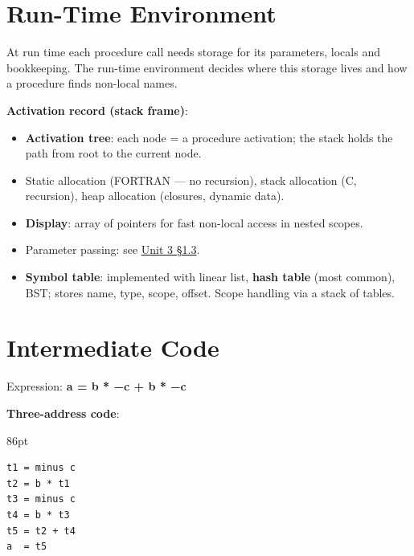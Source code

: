 

\needspace{125pt}

\hypertarget{p2-08--12-run-time-environment}{%
\section{Run-Time Environment}\label{p2-08--12-run-time-environment}}

At run time each procedure call needs storage for its parameters, locals and bookkeeping. The run-time
environment decides where this storage lives and how a procedure finds non-local names.



\textbf{Activation record (stack frame)}:



\begin{itemize}
\tightlist
\item
  \textbf{Activation tree}: each node = a procedure activation; the stack holds the path from root to the current node.
\item
  Static allocation (FORTRAN --- no recursion), stack allocation (C, recursion), heap allocation (closures, dynamic data).
\item
  \textbf{Display}: array of pointers for fast non-local access in nested scopes.
\item
  Parameter passing: see \protect\hyperlink{p2-03--13-parameter-passing}{Unit 3 §1.3}.
\item
  \textbf{Symbol table}: implemented with linear list, \textbf{hash table} (most common), BST; stores name, type, scope, offset. Scope handling via a stack of tables.
\end{itemize}

\needspace{196pt}

\hypertarget{p2-08--13-intermediate-code}{%
\section{Intermediate Code}\label{p2-08--13-intermediate-code}}

Expression: \textbf{a = b * −c + b * −c}

\textbf{Three-address code}:

\begin{listingblock}{86pt}
\begin{Verbatim}[fontsize=\fontsize{9.0}{10.9}\selectfont]
t1 = minus c
t2 = b * t1
t3 = minus c
t4 = b * t3
t5 = t2 + t4
a  = t5
\end{Verbatim}
\end{listingblock}

